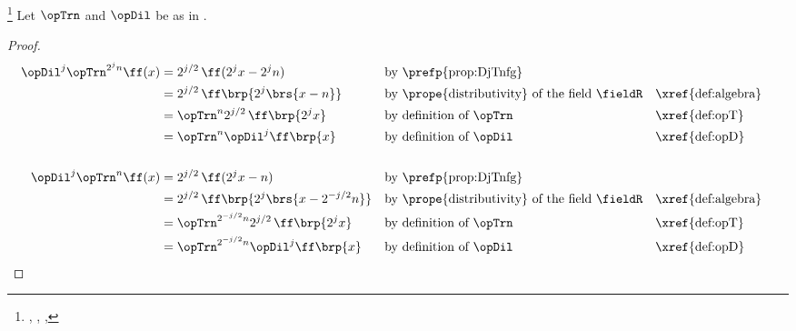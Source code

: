\begin{proposition}
\footnote{
  ,
  ,
  ,
  }
\label{prop:DTTD}
Let $\opTrn$ and $\opDil$ be as in .
\end{proposition}
\begin{proof}
  \begin{align*}
    \opDil^j \opTrn^{2^jn}\ff(x)
      &= 2^{j/2}\,\ff(2^jx-2^jn)
      && \text{by \prefp{prop:DjTnfg}}
    \\&= 2^{j/2}\,\ff\brp{2^j\brs{x-n}}
      && \text{by \prope{distributivity} of the field $\fieldR$} && \text{\xref{def:algebra}}
    \\&= \opTrn^n 2^{j/2}\,\ff\brp{2^jx}
      && \text{by definition of $\opTrn$}  && \text{\xref{def:opT}}
    \\&= \opTrn^n \opDil^j\ff\brp{x}
      && \text{by definition of $\opDil$}  && \text{\xref{def:opD}}
    \\
    \\
    \opDil^j \opTrn^n\ff(x)
      &= 2^{j/2}\,\ff(2^jx-n)
      && \text{by \prefp{prop:DjTnfg}}
    \\&= 2^{j/2}\,\ff\brp{2^j\brs{x-2^{-j/2}n}}
      && \text{by \prope{distributivity} of the field $\fieldR$}  && \text{\xref{def:algebra}}
    \\&= \opTrn^{2^{-j/2}n} 2^{j/2}\,\ff\brp{2^jx}
      && \text{by definition of $\opTrn$}  && \text{\xref{def:opT}}
    \\&= \opTrn^{2^{-j/2}n} \opDil^j\ff\brp{x}
      && \text{by definition of $\opDil$}  && \text{\xref{def:opD}}
  \end{align*}
\end{proof}



